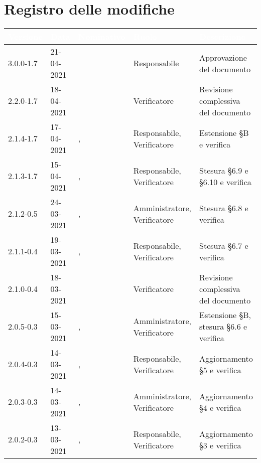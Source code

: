 \section*{Registro delle modifiche}
{
\setcounter{table}{-1}
{
\renewcommand{\arraystretch}{1.5}
\centering
\begin{longtable}{C{1.7cm} | C{2.2cm} | C{3.2cm} | C{3cm} | C{4.8cm}}
\textcolor{white}{\textbf{Versione}}&
\textcolor{white}{\textbf{Data}}&
\textcolor{white}{\textbf{Nominativo}}&
\textcolor{white}{\textbf{Ruolo}}&
\textcolor{white}{\textbf{Descrizione}}\\	
\endhead

3.0.0-1.7 & 21-04-2021 & \RA{} & Responsabile & Approvazione del documento\\

2.2.0-1.7 & 18-04-2021 & \SG{} & Verificatore & Revisione complessiva del documento\\

2.1.4-1.7 & 17-04-2021 & \SH{}, \SG{} & Responsabile, Verificatore & Estensione \S B e verifica\\

2.1.3-1.7 & 15-04-2021 & \SH{}, \SG{} & Responsabile, Verificatore & Stesura \S 6.9 e \S 6.10 e verifica\\

2.1.2-0.5 & 24-03-2021 & \PA{}, \BM{} & Amministratore, Verificatore & Stesura \S 6.8 e verifica\\

2.1.1-0.4 & 19-03-2021 & \SH{}, \BM{} & Responsabile, Verificatore & Stesura \S 6.7 e verifica\\

2.1.0-0.4 & 18-03-2021 & \BM{} & Verificatore & Revisione complessiva del documento\\

2.0.5-0.3 & 15-03-2021 & \SG{}, \RA{} & Amministratore, Verificatore & Estensione \S B, stesura \S 6.6 e verifica\\

2.0.4-0.3 & 14-03-2021 & \ZM{}, \BM{} & Responsabile, Verificatore & Aggiornamento \S 5 e verifica\\

2.0.3-0.3 & 14-03-2021 & \BM{}, \RA{} & Amministratore, Verificatore & Aggiornamento \S 4 e verifica\\

2.0.2-0.3 & 13-03-2021 & \ZM{}, \SG{} & Responsabile, Verificatore & Aggiornamento \S 3 e verifica\\


\end{longtable}}}
